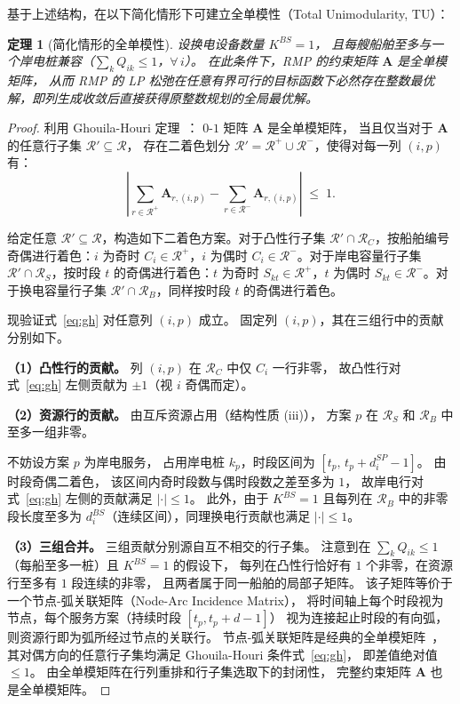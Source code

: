 \documentclass[UTF8, a4paper, 12pt]{ctexart}
\newtheorem{theorem}{定理}
\begin{document}
基于上述结构，在以下简化情形下可建立全单模性（Total Unimodularity, TU）：

\begin{theorem}[简化情形的全单模性]
\label{thm:tu}
设换电设备数量 $K^{BS}=1$，
且每艘船舶至多与一个岸电桩兼容（$\sum_{k}Q_{ik}\le 1$，$\forall\,i$）。
在此条件下，RMP 的约束矩阵 $\mathbf{A}$ 是全单模矩阵，
从而 RMP 的 LP 松弛在任意有界可行的目标函数下必然存在整数最优解，即列生成收敛后直接获得原整数规划的全局最优解。
\end{theorem}

\begin{proof}
利用 Ghouila-Houri 定理~\cite{Papadimitriou1998}：
$0$-$1$ 矩阵 $\mathbf{A}$ 是全单模矩阵，
当且仅当对于 $\mathbf{A}$ 的任意行子集 $\mathcal{R}'\subseteq\mathcal{R}$，
存在二着色划分 $\mathcal{R}'=\mathcal{R}^+\cup\mathcal{R}^-$，使得对每一列 $(i,p)$ 有：
\begin{equation}
  \left|
    \sum_{r\in\mathcal{R}^+}\mathbf{A}_{r,(i,p)}
    -
    \sum_{r\in\mathcal{R}^-}\mathbf{A}_{r,(i,p)}
  \right|
  \;\le\; 1.
  \label{eq:gh}
\end{equation}

给定任意 $\mathcal{R}'\subseteq\mathcal{R}$，构造如下二着色方案。对于凸性行子集 $\mathcal{R}'\cap\mathcal{R}_C$，按船舶编号奇偶进行着色：$i$ 为奇时 $C_i\in\mathcal{R}^+$，$i$ 为偶时 $C_i\in\mathcal{R}^-$。对于岸电容量行子集 $\mathcal{R}'\cap\mathcal{R}_S$，按时段 $t$ 的奇偶进行着色：$t$ 为奇时 $S_{kt}\in\mathcal{R}^+$，$t$ 为偶时 $S_{kt}\in\mathcal{R}^-$。对于换电容量行子集 $\mathcal{R}'\cap\mathcal{R}_B$，同样按时段 $t$ 的奇偶进行着色。

现验证式~\eqref{eq:gh} 对任意列 $(i,p)$ 成立。
固定列 $(i,p)$，其在三组行中的贡献分别如下。

\medskip
\noindent\textbf{（1）凸性行的贡献。}
列 $(i,p)$ 在 $\mathcal{R}_C$ 中仅 $C_i$ 一行非零，
故凸性行对式~\eqref{eq:gh} 左侧贡献为 $\pm 1$（视 $i$ 奇偶而定）。

\medskip
\noindent\textbf{（2）资源行的贡献。}
由互斥资源占用（结构性质 (iii)），
方案 $p$ 在 $\mathcal{R}_S$ 和 $\mathcal{R}_B$ 中至多一组非零。

不妨设方案 $p$ 为岸电服务，
占用岸电桩 $k_p$，时段区间为 $[t_p,\,t_p+d_i^{SP}-1]$。
由时段奇偶二着色，
该区间内奇时段数与偶时段数之差至多为 $1$，
故岸电行对式~\eqref{eq:gh} 左侧的贡献满足 $|\cdot|\le 1$。
此外，由于 $K^{BS}=1$ 且每列在 $\mathcal{R}_B$ 中的非零段长度至多为
$d_i^{BS}$（连续区间），同理换电行贡献也满足 $|\cdot|\le 1$。

\medskip
\noindent\textbf{（3）三组合并。}
三组贡献分别源自互不相交的行子集。
注意到在 $\sum_k Q_{ik}\le 1$（每船至多一桩）且 $K^{BS}=1$ 的假设下，
每列在凸性行恰好有 $1$ 个非零，在资源行至多有 $1$ 段连续的非零，
且两者属于同一船舶的局部子矩阵。
该子矩阵等价于一个节点-弧关联矩阵（Node-Arc Incidence Matrix），
将时间轴上每个时段视为节点，每个服务方案（持续时段 $[t_p, t_p+d-1]$）
视为连接起止时段的有向弧，则资源行即为弧所经过节点的关联行。
节点-弧关联矩阵是经典的全单模矩阵~\cite{Nemhauser1988}，
其对偶方向的任意行子集均满足 Ghouila-Houri 条件式~\eqref{eq:gh}，
即差值绝对值 $\le 1$。
由全单模矩阵在行列重排和行子集选取下的封闭性，
完整约束矩阵 $\mathbf{A}$ 也是全单模矩阵。


\end{proof}
\end{document}
